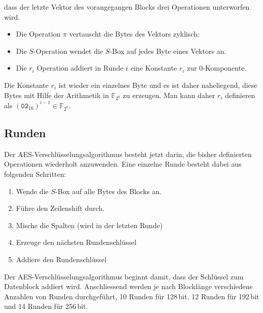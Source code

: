 dass der letzte Vektor des vorangegangen Blocks drei Operationen
unterworfen wird.
\begin{itemize}
\item
Die Operation $\pi$ vertauscht die Bytes des Vektors zyklisch:
\begin{center}
\end{center}
\item
Die $S$-Operation wendet die $S$-Box auf jedes Byte eines Vektors an.
\item
Die $r_i$ Operation addiert in Runde $i$ eine Konstante $r_i$ zur
$0$-Komponente.
\end{itemize}
Die Konstante $r_i$ ist wieder ein einzelnes Byte und es ist daher
naheliegend, diese Bytes mit Hilfe der Arithmetik in $\mathbb{F}_{2^8}$
zu erzeugen.
Man kann daher $r_i$ definieren als
$(\texttt{02}_{16})^{i-1}\in\mathbb{F}_{2^8}$.

\subsection{Runden}
Der AES-Verschlüsselungsalgorithmus besteht jetzt darin, die bisher
definierten Operationen wiederholt anzuwenden.
Eine einzelne Runde besteht dabei aus folgenden Schritten:
\begin{enumerate}
\item Wende die $S$-Box auf alle Bytes des Blocks an.
\item Führe den Zeilenshift durch.
\item Mische die Spalten (wird in der letzten Runde)
\item Erzeuge den nächsten Rundenschlüssel
\item Addiere den Rundenschlüssel
\end{enumerate}
Der AES-Verschlüsselungsalgorithmus beginnt damit, dass der Schlüssel
zum Datenblock addiert wird.
Anschliessend werden je nach Blocklänge verschiedene Anzahlen von
Runden durchgeführt, 10 Runden für 128\,bit, 12 Runden für 192\,bit und
14 Runden für 256\,bit.





